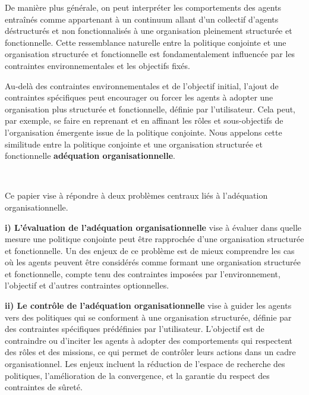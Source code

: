 \documentclass[sigconf,anonymous]{aamas}
\begin{document}
De manière plus générale, on peut interpréter les comportements des agents entraînés comme appartenant à un continuum allant d'un collectif d'agents déstructurés et non fonctionnalisés à une organisation pleinement structurée et fonctionnelle. Cette ressemblance naturelle entre la politique conjointe et une organisation structurée et fonctionnelle est fondamentalement influencée par les contraintes environnementales et les objectifs fixés.

Au-delà des contraintes environnementales et de l'objectif initial, l'ajout de contraintes spécifiques peut encourager ou forcer les agents à adopter une organisation plus structurée et fonctionnelle, définie par l'utilisateur. Cela peut, par exemple, se faire en reprenant et en affinant les rôles et sous-objectifs de l'organisation émergente issue de la politique conjointe.
Nous appelons cette similitude entre la politique conjointe et une organisation structurée et fonctionnelle \textbf{adéquation organisationnelle}.

\

\noindent Ce papier vise à répondre à deux problèmes centraux liés à l'adéquation organisationnelle.

\quad \textbf{i) L'évaluation de l'adéquation organisationnelle} vise à évaluer dans quelle mesure une politique conjointe peut être rapprochée d'une organisation structurée et fonctionnelle. Un des enjeux de ce problème est de mieux comprendre les cas où les agents peuvent être considérés comme formant une organisation structurée et fonctionnelle, compte tenu des contraintes imposées par l'environnement, l'objectif et d'autres contraintes optionnelles.

\quad \textbf{ii) Le contrôle de l'adéquation organisationnelle} vise à guider les agents vers des politiques qui se conforment à une organisation structurée, définie par des contraintes spécifiques prédéfinies par l'utilisateur. L'objectif est de contraindre ou d'inciter les agents à adopter des comportements qui respectent des rôles et des missions, ce qui permet de contrôler leurs actions dans un cadre organisationnel. Les enjeux incluent la réduction de l'espace de recherche des politiques, l'amélioration de la convergence, et la garantie du respect des contraintes de sûreté.
\end{document}
